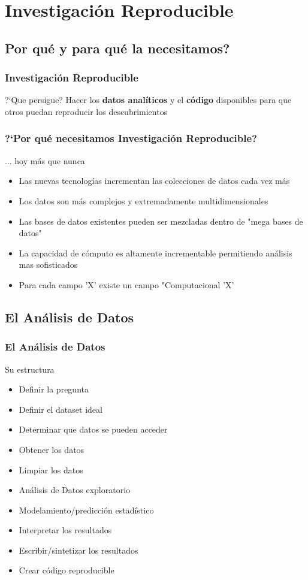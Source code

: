 \documentclass[sans serif,9pt,xcolor=dvipsnames]{beamer}%
\begin{document}
\section{Investigación Reproducible}
\subsection{Por qué y para qué la necesitamos?}
\begin{frame}
\frametitle {Investigación Reproducible}
\justifying
\begin{block}{?`Que persigue?}
\LARGE Hacer los \textbf{datos analíticos} y el \textbf{código} disponibles para que otros puedan reproducir los descubrimientos
\end{block}
\end{frame}


\begin{frame}
\frametitle{?`Por qué necesitamos Investigación Reproducible?}
\begin{block}{... hoy más que nunca}
\begin{itemize}
\justifying
\item Las nuevas tecnologías incrementan las colecciones de datos cada vez más
\item Los datos son más complejos y extremadamente multidimensionales
\item Las bases de datos existentes pueden ser mezcladas dentro de "mega bases de datos"
\item La capacidad de cómputo es altamente incrementable permitiendo análisis mas sofisticados
\item Para cada campo 'X' existe un campo "Computacional 'X'

\end{itemize}
\end{block}
\end{frame}

\subsection{El Análisis de Datos}
\begin{frame}
\frametitle{El Análisis de Datos }
\justifying
\begin{block}{Su estructura}
\begin{itemize}
\item Definir la pregunta
\item Definir el dataset ideal
\item Determinar que datos se pueden acceder
\item Obtener los datos
\item Limpiar los datos
\item Análisis de Datos exploratorio
\item Modelamiento/predicción estadístico
\item Interpretar los resultados
\item Escribir/sintetizar los resultados
\item Crear código reproducible
\end{itemize}
\end{block}
\end{frame}
\end{document}
